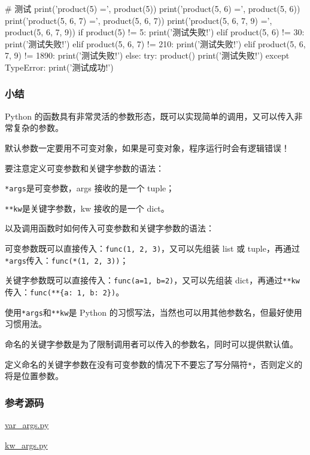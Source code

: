 \begin{pythoncode}
# 测试
print('product(5) =', product(5))
print('product(5, 6) =', product(5, 6))
print('product(5, 6, 7) =', product(5, 6, 7))
print('product(5, 6, 7, 9) =', product(5, 6, 7, 9))
if product(5) != 5:
    print('测试失败!')
elif product(5, 6) != 30:
    print('测试失败!')
elif product(5, 6, 7) != 210:
    print('测试失败!')
elif product(5, 6, 7, 9) != 1890:
    print('测试失败!')
else:
    try:
        product()
        print('测试失败!')
    except TypeError:
        print('测试成功!')
\end{pythoncode}

\hypertarget{ux5c0fux7ed3}{%
\subsubsection{小结}\label{ux5c0fux7ed3}}

Python
的函数具有非常灵活的参数形态，既可以实现简单的调用，又可以传入非常复杂的参数。

默认参数一定要用不可变对象，如果是可变对象，程序运行时会有逻辑错误！

要注意定义可变参数和关键字参数的语法：

\texttt{*args}是可变参数，args 接收的是一个 tuple；

\texttt{**kw}是关键字参数，kw 接收的是一个 dict。

以及调用函数时如何传入可变参数和关键字参数的语法：

可变参数既可以直接传入：\texttt{func(1,\ 2,\ 3)}，又可以先组装 list 或
tuple，再通过\texttt{*args}传入：\texttt{func(*(1,\ 2,\ 3))}；

关键字参数既可以直接传入：\texttt{func(a=1,\ b=2)}，又可以先组装
dict，再通过\texttt{**kw}传入：\texttt{func(**\{\textquotesingle{}a\textquotesingle{}:\ 1,\ \textquotesingle{}b\textquotesingle{}:\ 2\})}。

使用\texttt{*args}和\texttt{**kw}是 Python
的习惯写法，当然也可以用其他参数名，但最好使用习惯用法。

命名的关键字参数是为了限制调用者可以传入的参数名，同时可以提供默认值。

定义命名的关键字参数在没有可变参数的情况下不要忘了写分隔符\texttt{*}，否则定义的将是位置参数。

\hypertarget{ux53c2ux8003ux6e90ux7801}{%
\subsubsection{参考源码}\label{ux53c2ux8003ux6e90ux7801}}

\href{https://github.com/michaelliao/learn-python3/blob/master/samples/function/var_args.py}{var\_args.py}

\href{https://github.com/michaelliao/learn-python3/blob/master/samples/function/kw_args.py}{kw\_args.py}

